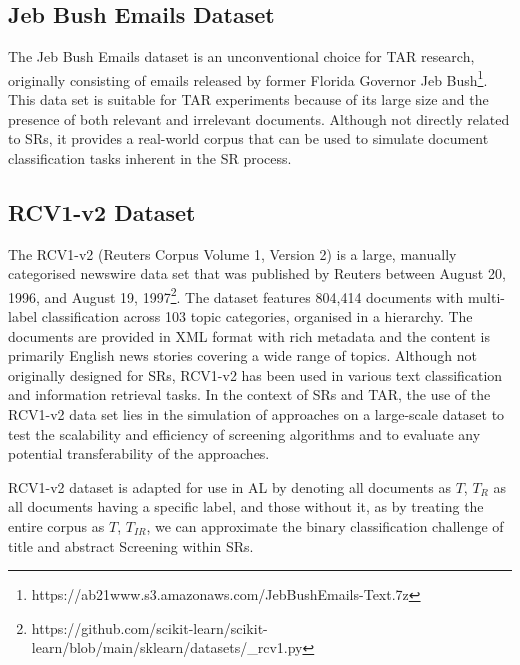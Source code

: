 \documentclass[10pt, english]{article}
\begin{document}
\subsection{Jeb Bush Emails Dataset}
The Jeb Bush Emails dataset is an unconventional choice for TAR research, originally consisting of emails released by former Florida Governor Jeb Bush\footnote{https://ab21www.s3.amazonaws.com/JebBushEmails-Text.7z}. This data set is suitable for TAR experiments because of its large size and the presence of both relevant and irrelevant documents. Although not directly related to SRs, it provides a real-world corpus that can be used to simulate document classification tasks inherent in the SR process.

\subsection{RCV1-v2 Dataset}
The RCV1-v2 (Reuters Corpus Volume 1, Version 2) is a large, manually categorised newswire data set \cite{lewis_rcv1_2004} that was published by Reuters between August 20, 1996, and August 19, 1997\footnote{https://github.com/scikit-learn/scikit-learn/blob/main/sklearn/datasets/\_rcv1.py}. The dataset features 804,414 documents with multi-label classification across 103 topic categories, organised in a hierarchy. The documents are provided in XML format with rich metadata and the content is primarily English news stories covering a wide range of topics.
Although not originally designed for SRs, RCV1-v2 has been used in various text classification and information retrieval tasks.  In the context of SRs and TAR, the use of the RCV1-v2 data set lies in the simulation of approaches on a large-scale dataset to test the scalability and efficiency of screening algorithms and to evaluate any potential transferability of the approaches.

RCV1-v2 dataset is adapted for use in AL by denoting all documents as \textbf{$T$}, \textbf{$T_R$} as all documents having a specific label, and those without it, as by treating the entire corpus as \textbf{$T$}, \textbf{$T_{IR}$}, we can approximate the binary classification challenge of title and abstract Screening within SRs.
\end{document}
